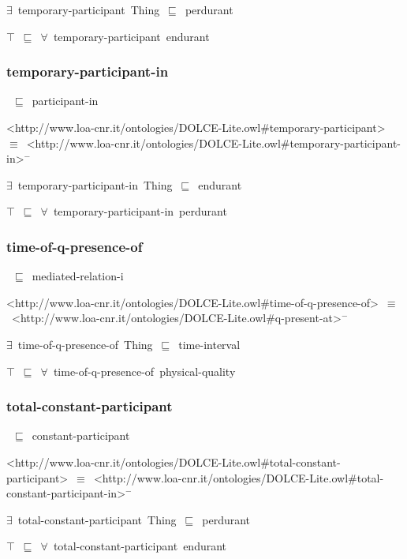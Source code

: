 \documentclass{article}
\begin{document}
\ensuremath{\exists}~temporary-participant~Thing~\ensuremath{\sqsubseteq}~perdurant

\ensuremath{\top}~\ensuremath{\sqsubseteq}~\ensuremath{\forall}~temporary-participant~endurant

\subsubsection*{temporary-participant-in}

~\ensuremath{\sqsubseteq}~participant-in

<http://www.loa-cnr.it/ontologies/DOLCE-Lite.owl#temporary-participant>~\ensuremath{\equiv}~<http://www.loa-cnr.it/ontologies/DOLCE-Lite.owl#temporary-participant-in>\ensuremath{^-}

\ensuremath{\exists}~temporary-participant-in~Thing~\ensuremath{\sqsubseteq}~endurant

\ensuremath{\top}~\ensuremath{\sqsubseteq}~\ensuremath{\forall}~temporary-participant-in~perdurant

\subsubsection*{time-of-q-presence-of}

~\ensuremath{\sqsubseteq}~mediated-relation-i

<http://www.loa-cnr.it/ontologies/DOLCE-Lite.owl#time-of-q-presence-of>~\ensuremath{\equiv}~<http://www.loa-cnr.it/ontologies/DOLCE-Lite.owl#q-present-at>\ensuremath{^-}

\ensuremath{\exists}~time-of-q-presence-of~Thing~\ensuremath{\sqsubseteq}~time-interval

\ensuremath{\top}~\ensuremath{\sqsubseteq}~\ensuremath{\forall}~time-of-q-presence-of~physical-quality

\subsubsection*{total-constant-participant}

~\ensuremath{\sqsubseteq}~constant-participant

<http://www.loa-cnr.it/ontologies/DOLCE-Lite.owl#total-constant-participant>~\ensuremath{\equiv}~<http://www.loa-cnr.it/ontologies/DOLCE-Lite.owl#total-constant-participant-in>\ensuremath{^-}

\ensuremath{\exists}~total-constant-participant~Thing~\ensuremath{\sqsubseteq}~perdurant

\ensuremath{\top}~\ensuremath{\sqsubseteq}~\ensuremath{\forall}~total-constant-participant~endurant
\end{document}
